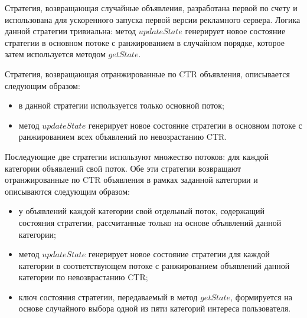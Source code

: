 \documentclass[specification,annotation,times]{itmo-student-thesis}
\begin{document}

Стратегия, возвращающая случайные объявления, разработана первой по счету и использована для ускоренного запуска первой версии рекламного сервера. Логика данной стратегии тривиальна: метод $updateState$ генерирует новое состояние стратегии в основном потоке с ранжированием в случайном порядке, которое затем используется методом $getState$.

Стратегия, возвращающая отранжированные по CTR объявления, описывается следующим образом:
\begin{itemize}
\item в данной стратегии используется только основной поток;
\item метод $updateState$ генерирует новое состояние стратегии в основном потоке с ранжированием всех объявлений по невозрастанию CTR.
\end{itemize}

Последующие две стратегии используют множество потоков: для каждой категории объявлений свой поток. Обе эти стратегии возвращают отранжированные по CTR объявления в рамках заданной категории и описываются следующим образом:
\begin{itemize}
\item у объявлений каждой категории свой отдельный поток, содержащий состояния стратегии, рассчитанные только на основе объявлений данной категории;
\item метод $updateState$ генерирует новое состояние стратегии для каждой категории в соответствующем потоке с ранжированием объявлений данной категории по невозврастанию CTR;
\item  ключ состояния стратегии, передаваемый в метод $getState$, формируется на основе случайного выбора одной из пяти категорий интереса пользователя.
\end{itemize}
\end{document}
